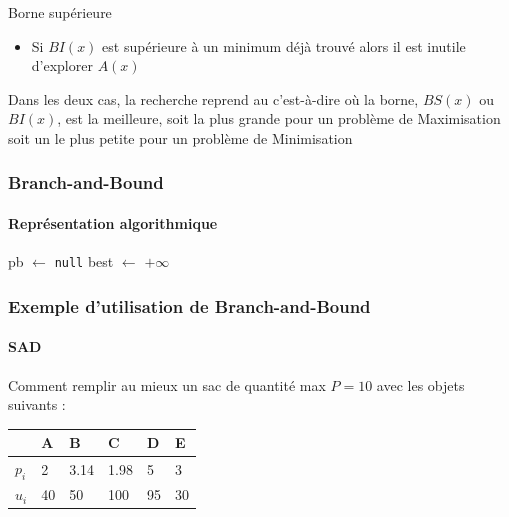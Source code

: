 \documentclass[aspectratio=1610,francais,envcountsect]{beamer}
\begin{document}
\begin{frame}[allowframebreaks]
\begin{block}{Borne supérieure}
\begin{itemize}
    \item Si $BI(x)$ est supérieure à un minimum déjà trouvé alors il
      est inutile d'explorer $A(x)$
    \end{itemize}

  \end{block}

  Dans les deux cas, la recherche reprend au c'est-à-dire où la borne, $BS(x)$ ou $BI(x)$, est la
  meilleure, soit la plus grande pour un problème de Maximisation soit
  un le plus petite pour un problème de Minimisation
\end{frame}

\begin{frame}[fragile]
  \frametitle{Branch-and-Bound} \framesubtitle{Représentation
    algorithmique}
  \begin{algorithm}[H]
    \small \DontPrintSemicolon {}
     pb $\leftarrow$ \texttt{null}\;
    best $\leftarrow$ $+\infty$\; 
  \end{algorithm}

  
\end{frame}

\begin{frame}
  \frametitle{Exemple d'utilisation de Branch-and-Bound}
  \framesubtitle{SAD}

  \begin{example}[SAD]
    Comment remplir au mieux un sac de quantité max $P = 10$ avec les
    objets suivants :

    \begin{center}
      \begin{tabular}{l|lllll}
        &A&B&C&D&E\\
        \hline
        $p_i$&2&3.14&1.98&5&3\\
        $u_i$&40&50&100&95&30
      \end{tabular}
    \end{center}

  \end{example}
\end{frame}
\end{document}
